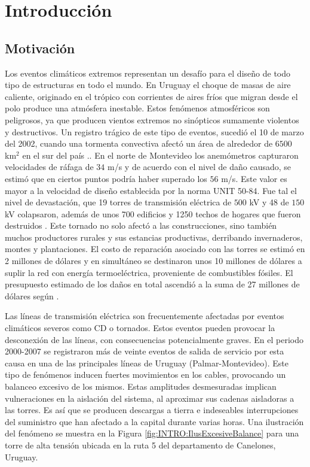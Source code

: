 \chapter{Introducción}\label{Cap:Introduccion}
 
\section{Motivación}
\linenumbers
Los eventos climáticos extremos representan un desafío para el diseño de todo tipo de estructuras en todo el mundo. En Uruguay el choque de masas de aire caliente, originado en el trópico con corrientes de aires fríos que migran desde el polo produce una atmósfera inestable. Estos fenómenos atmosféricos son peligrosos, ya que producen vientos extremos no sinópticos sumamente violentos y destructivos. Un registro trágico de este tipo de eventos, sucedió el 10 de marzo del 2002, cuando una tormenta convectiva afectó un área de alrededor de $6500$ km$^2$ en el sur del país \cite{tormenta2002}.. En el norte de Montevideo los anemómetros capturaron velocidades de ráfaga de $34$ m/s y de acuerdo con el nivel de daño causado, se estimó que en ciertos puntos podría haber superado los $56$ m/s. Este valor es mayor a la velocidad de diseño establecida por la norma UNIT 50-84. Fue tal el nivel de devastación, que 19 torres de transmisión eléctrica de $500$ kV y 48 de $150$ kV colapsaron, además de unos 700 edificios y 1250 techos de hogares que fueron destruidos \citep{duranona2015significance}. Este tornado no solo afectó a las construcciones, sino también muchos productores rurales y sus estancias productivas, derribando invernaderos, montes y plantaciones. El costo de reparación asociado con las torres se estimó en 2 millones de dólares y en simultáneo se destinaron unos 10 millones de dólares a suplir la red con energía termoeléctrica, proveniente de combustibles fósiles. El presupuesto estimado de los daños en total ascendió a la suma de 27 millones de dólares según \cite{duranona2019first}. 

Las líneas de transmisión eléctrica son frecuentemente afectadas por eventos climáticos severos como \gls{CD} o tornados. Estos eventos pueden provocar la desconexión de las líneas, con consecuencias potencialmente graves. En el periodo 2000-2007 se registraron más de veinte eventos de salida de servicio por esta causa en una de las principales líneas de Uruguay (Palmar-Montevideo). Este tipo de fenómenos inducen fuertes movimientos en los cables, provocando un balanceo excesivo de los mismos. Estas amplitudes desmesuradas implican vulneraciones en la aislación del sistema, al aproximar sus cadenas aisladoras a las torres. Es así que se producen descargas a tierra e indeseables interrupciones del suministro que han afectado a la capital durante varias horas. Una ilustración del fenómeno se muestra en la Figura \ref{fig:INTRO:IlusExcesiveBalance} para una torre de alta tensión ubicada en la ruta 5 del departamento de Canelones, Uruguay. 

